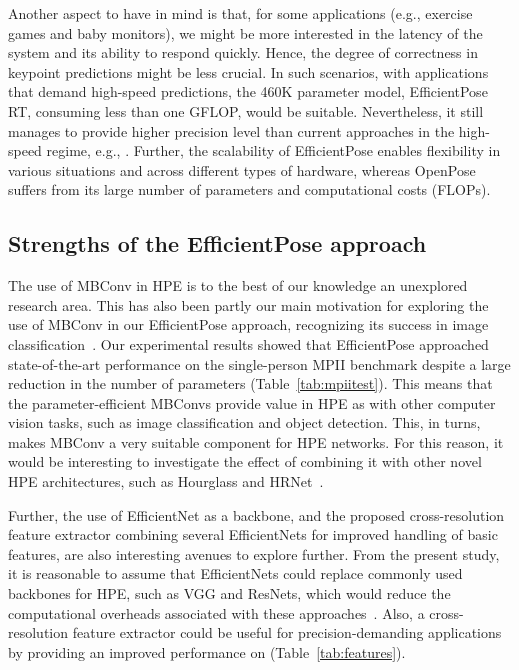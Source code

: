 Another aspect to have in mind is that, for some applications (e.g., exercise games and baby monitors), we might be more interested in the latency of the system and its ability to respond quickly. Hence, the degree of correctness in keypoint predictions might be less crucial. In such scenarios, with applications that demand high-speed predictions, the 460K parameter model, EfficientPose RT, consuming less than one GFLOP, would be suitable. Nevertheless, it still manages to provide higher precision level than current approaches in the high-speed regime, e.g., \cite{bulat2020toward, tang2018cu}. Further, the scalability of EfficientPose enables flexibility in various situations and across different types of hardware, whereas OpenPose suffers from its large number of parameters and computational costs (FLOPs). 

\subsection{Strengths of the EfficientPose approach}
\label{sec:strengths}

The use of MBConv in HPE is to the best of our knowledge an unexplored research area. This has also been partly our main motivation for exploring the use of MBConv in our EfficientPose approach, recognizing its success in image classification~\cite{tan2019efficientnet}. Our experimental results showed that EfficientPose approached state-of-the-art performance on the single-person MPII benchmark despite a large reduction in the number of parameters (Table~\ref{tab:mpiitest}). This means that the parameter-efficient MBConvs provide value in HPE as with other computer vision tasks, such as image classification and object detection. This, in turns, makes MBConv a very suitable component for HPE networks. For this reason, it would be interesting to investigate the effect of combining it with other novel HPE architectures, such as Hourglass and HRNet~\cite{newell2016stacked, sun2019deep}. 

Further, the use of EfficientNet as a backbone, and the proposed cross-resolution feature extractor combining several EfficientNets for improved handling of basic features, are also interesting avenues to explore further. From the present study, it is reasonable to assume that EfficientNets could replace commonly used backbones for HPE, such as VGG and ResNets, which would reduce the computational overheads associated with these approaches~\cite{simonyan2014very, he2016deep}. Also, a cross-resolution feature extractor could be useful for precision-demanding applications by providing an improved performance on  (Table~\ref{tab:features}). 

